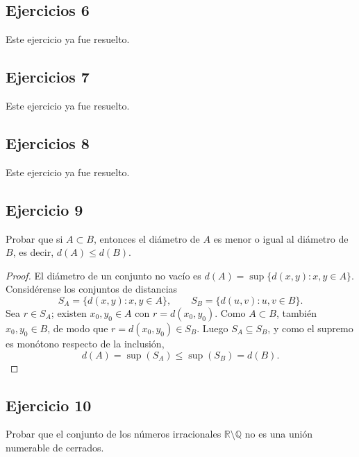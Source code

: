 \documentclass[11pt, a4paper]{article}
\begin{document}
\subsection*{Ejercicios 6}

Este ejercicio ya fue resuelto.

\subsection*{Ejercicios 7}

Este ejercicio ya fue resuelto.

\subsection*{Ejercicios 8}

Este ejercicio ya fue resuelto.

\subsection*{Ejercicio 9}

Probar que si $A \subset B$, entonces el diámetro de $A$ es menor o igual al diámetro de $B$, es
decir, $d(A) \le d(B)$.

\begin{proof}
El diámetro de un conjunto no vacío es $d(A) = \sup \{ d(x, y) : x, y \in A \}$. Considérense los
conjuntos de distancias
$$ S_A = \{ d(x, y) : x, y \in A \}, \qquad S_B = \{ d(u, v) : u, v \in B \}. $$
Sea $r \in S_A$; existen $x_0, y_0 \in A$ con $r = d(x_0, y_0)$. Como $A \subset B$, también
$x_0, y_0 \in B$, de modo que $r = d(x_0, y_0) \in S_B$. Luego $S_A \subseteq S_B$, y como el supremo es
monótono respecto de la inclusión,
$$ d(A) = \sup(S_A) \le \sup(S_B) = d(B). $$
\end{proof}

\subsection*{Ejercicio 10}

Probar que el conjunto de los números irracionales $\mathbb{R} \setminus \mathbb{Q}$ no es una unión
numerable de cerrados.
\end{document}
